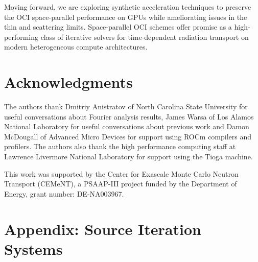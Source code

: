 Moving forward, we are exploring synthetic acceleration techniques to preserve the OCI space-parallel performance on GPUs while ameliorating issues in the thin and scattering limits.
Space-parallel OCI schemes offer promise as a high-performing class of iterative solvers for time-dependent radiation transport on modern heterogeneous compute architectures.

\section*{Acknowledgments}

The authors thank Dmitriy Anistratov of North Carolina State University for useful conversations about Fourier analysis results, James Warsa of Los Alamos National Laboratory for useful conversations about previous work and Damon McDougall of Advanced Micro Devices for support using ROCm compilers and profilers. 
The authors also thank the high performance computing staff at Lawrence Livermore National Laboratory for support using the Tioga machine.

This work was supported by the Center for Exascale Monte Carlo Neutron Transport (CEMeNT), a PSAAP-III project funded by the Department of Energy, grant number: DE-NA003967.

\section*{Appendix: Source Iteration Systems}
\label{app:source_iteration}

\newcommand{\lph}{^{(l+1/2)}}
\newcommand{\lp}{^{(l+1)}}


